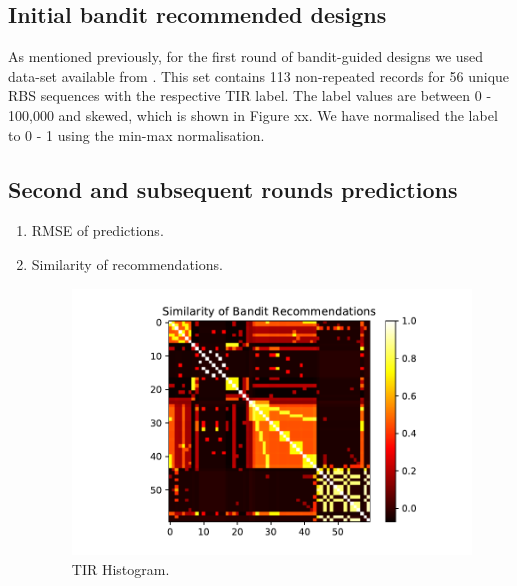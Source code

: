 \documentclass{article}
\begin{document}
\subsection{Initial bandit recommended designs}
As mentioned previously, for the first round of bandit-guided designs we used data-set available from \textcite{jervis2018machine}. This set contains 113 non-repeated records for 56 unique RBS sequences with the respective TIR label. The label values are between 0 - 100,000 and skewed, which is shown in Figure xx. We have normalised the label to 0 - 1 using the min-max normalisation.   


\subsection{Second and subsequent rounds predictions}

\begin{enumerate}
    \item RMSE of predictions.
    
    \item Similarity of recommendations. 
    \begin{figure}[t]
    \centering
    \includegraphics[scale=0.7]{plots/similarity_first_round_recommendation.pdf}
    \caption{TIR Histogram.}
    \label{fig: TIR Histogram.}
\end{figure}
\end{enumerate}{}


\newpage

\printbibliography
\end{document}
